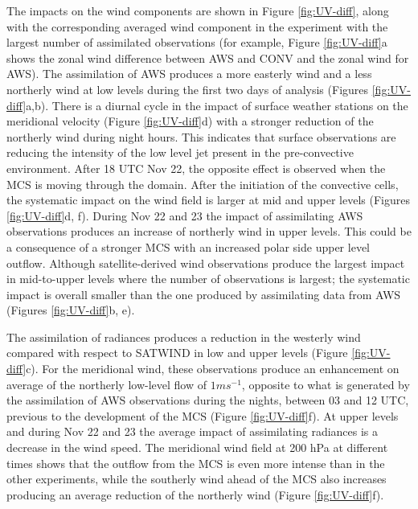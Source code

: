 \documentclass[final,5p,times,twocolumn,authoryear]{elsarticle} %
\begin{document}
The impacts on the wind components are shown in Figure \ref{fig:UV-diff}, along with the corresponding averaged wind component in the experiment with the largest number of assimilated observations (for example, Figure \ref{fig:UV-diff}a shows the zonal wind difference between AWS and CONV and the zonal wind for AWS). The assimilation of AWS produces a more easterly wind and a less northerly wind at low levels during the first two days of analysis (Figures \ref{fig:UV-diff}a,b). There is a diurnal cycle in the impact of surface weather stations on the meridional velocity (Figure \ref{fig:UV-diff}d) with a stronger reduction of the northerly wind during night hours. This indicates that surface observations are reducing the intensity of the low level jet present in the pre-convective environment. After 18 UTC Nov 22, the opposite effect is observed when the MCS is moving through the domain. After the initiation of the convective cells, the systematic impact on the wind field is larger at mid and upper levels (Figures \ref{fig:UV-diff}d, f). During Nov 22 and 23 the impact of assimilating AWS observations produces an increase of northerly wind in upper levels. This could be a consequence of a stronger MCS with an increased polar side upper level outflow. Although satellite-derived wind observations produce the largest impact in mid-to-upper levels where the number of observations is largest; the systematic impact is overall smaller than the one produced by assimilating data from AWS (Figures \ref{fig:UV-diff}b, e).

The assimilation of radiances produces a reduction in the westerly wind compared with respect to SATWIND in low and upper levels (Figure \ref{fig:UV-diff}c). For the meridional wind, these observations produce an enhancement on average of the northerly low-level flow of \(1 ms^{-1}\), opposite to what is generated by the assimilation of AWS observations during the nights, between 03 and 12 UTC, previous to the development of the MCS (Figure \ref{fig:UV-diff}f). At upper levels and during Nov 22 and 23 the average impact of assimilating radiances is a decrease in the wind speed. The meridional wind field at 200 hPa at different times shows that the outflow from the MCS is even more intense than in the other experiments, while the southerly wind ahead of the MCS also increases producing an average reduction of the northerly wind (Figure \ref{fig:UV-diff}f).
\end{document}

